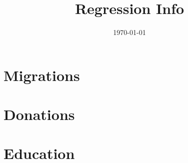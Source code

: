 \documentclass[11pt]{article}
\title{Regression Info}
\date{\today}
\begin{document}
\section{Migrations}










\clearpage
\section{Donations}




%
%

\clearpage
\section{Education}

\end{document}
